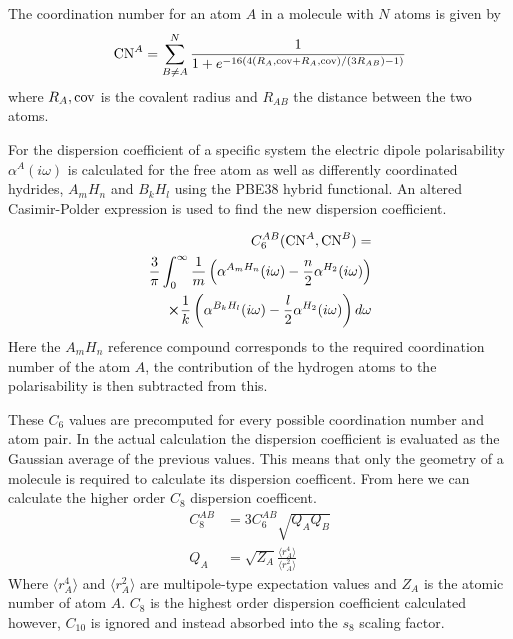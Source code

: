 \documentclass[10pt,a4paper,twocolumn,twoside]{extarticle}
\begin{document}
	The coordination number for an atom $A$ in a molecule with $N$ atoms is given by 
	{\small
	\begin{align}
		{\rm CN}^A = \sum_{B \neq A}^N \frac{1}{1 + e^{-16(4(R_A,{\rm cov} + R_A,{\rm cov})/(3R_{AB}) - 1)}}
	\end{align}}
	where $R_A,{\rm cov}$ is the covalent radius and $R_{AB}$ the distance between the two atoms.

	For the dispersion coefficient of a specific system the electric dipole polarisability $\alpha^A (i\omega)$ is calculated for the free atom as well as differently coordinated hydrides, $A_mH_n$ and $B_kH_l$ using the PBE38 hybrid functional.\cite{Grimme2011} An altered Casimir-Polder expression is used to find the new dispersion coefficient. 

	\begin{align}
		C_6^{AB} ({\rm CN}^A , {\rm CN}^B) =  \nonumber \\ \frac{3}{\pi} \int^{\infty}_0 \frac{1}{m} \left(\alpha^{A_m H_n}(i\omega) - \frac{n}{2} \alpha^{H_2} (i\omega) \right) \nonumber \\ \cross \frac{1}{k} \left(\alpha^{B_k H_l}(i\omega) - \frac{l}{2} \alpha^{H_2} (i\omega)\right) d\omega 
	\end{align}
	Here the $A_mH_n$ reference compound corresponds to the required coordination number of the atom $A$, the contribution of the hydrogen atoms to the polarisability is then subtracted from this. 
	
	These $C_6$ values are precomputed for every possible coordination number and atom pair. In the actual calculation the dispersion coefficient is evaluated as the Gaussian average of the previous values. This means that only the geometry of a molecule is required to calculate its dispersion coefficent. From here we can calculate the higher order $C_8$ dispersion coefficent.
	\begin{align}
		C_8^{AB} &= 3C_6^{AB} \sqrt{Q_A Q_B}\\
		Q_A  &= \sqrt{Z_A} \frac{\langle r_A^4 \rangle}{\langle r_A^2 \rangle}
	\end{align}
	Where $\langle r_A^4 \rangle$ and $\langle r_A^2 \rangle$ are multipole-type expectation values and $Z_A$ is the atomic number of atom $A$. $C_8$ is the highest order dispersion coefficient calculated however, $C_{10}$ is ignored and instead absorbed into the $s_8$ scaling factor.
\end{document}
